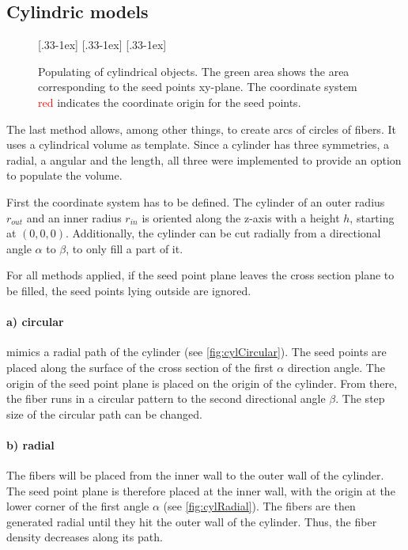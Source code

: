\subsection{Cylindric models}
%
\begin{figure}[!t]
    \centering
    \setlength{\tikzwidth}{0.31\textwidth}
    [.33\textwidth-1ex]{
    }\hfill
    [.33\textwidth-1ex]{
    }\hfill
    [.33\textwidth-1ex]{
    }
	\caption{Populating of cylindrical objects. The green area shows the area corresponding to the seed points xy-plane. The coordinate system \textcolor{RED}{red} indicates the coordinate origin for the seed points.}
\end{figure}
%
The last method allows, among other things, to create arcs of circles of fibers.
It uses a cylindrical volume as template.
%
Since a cylinder has three symmetries, a radial, a angular and the length, all three were implemented to provide an option to populate the volume.
\par
%
First the coordinate system has to be defined.
The cylinder of an outer radius $r_{\mathit{out}}$ and an inner radius $r_{\mathit{in}}$ is oriented along the z-axis with a height $h$, starting at $(0,0,0)$.
Additionally, the cylinder can be cut radially from a directional angle $\alpha$ to $\beta$, to only fill a part of it.
\par
%
For all methods applied, if the seed point plane leaves the cross section plane to be filled, the seed points lying outside are ignored.
%
\paragraph{a) circular} mimics a radial path of the cylinder (see \cref{fig:cylCircular}).
The seed points are placed along the surface of the cross section of the first $\alpha$ direction angle.
The origin of the seed point plane is placed on the origin of the cylinder.
From there, the fiber runs in a circular pattern to the second directional angle $\beta$.
The step size of the circular path can be changed.
%
\paragraph{b) radial} The fibers will be placed from the inner wall to the outer wall of the cylinder.
The seed point plane is therefore placed at the inner wall, with the origin at the lower corner of the first angle $\alpha$ (see \cref{fig:cylRadial}).
The fibers are then generated radial until they hit the outer wall of the cylinder.
Thus, the fiber density decreases along its path.
%
